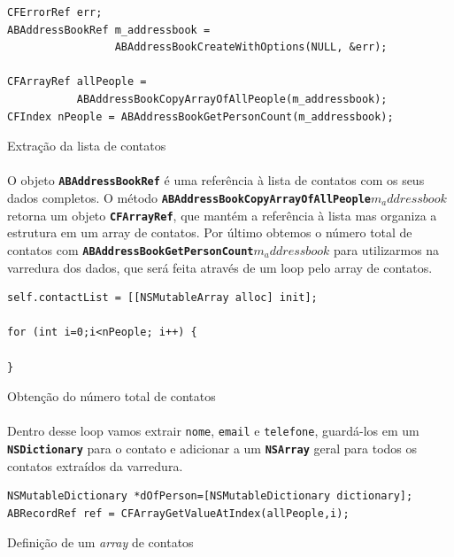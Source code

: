 \documentclass[a4paper,12pt,brazil,doubleside]{book}
\begin{document}
\begin{singlespace}
\begin{listing}[H]
\begin{verbatim}
CFErrorRef err;
ABAddressBookRef m_addressbook =
                 ABAddressBookCreateWithOptions(NULL, &err);
    
CFArrayRef allPeople =
           ABAddressBookCopyArrayOfAllPeople(m_addressbook);
CFIndex nPeople = ABAddressBookGetPersonCount(m_addressbook);
\end{verbatim}
\caption{Extração da lista de contatos}
\end{listing}

\paragraph{}O objeto \texttt{\textbf{ABAddressBookRef}} é uma referência à lista de contatos com os seus dados completos. O método \texttt{\textbf{ABAddressBookCopyArrayOfAllPeople\(m_addressbook\)}} retorna um objeto \texttt{\textbf{CFArrayRef}}, que mantém a referência à lista mas organiza a estrutura em um array de contatos. Por último obtemos o número total de contatos com
\linebreak \texttt{\textbf{ABAddressBookGetPersonCount\(m_addressbook\)}} para utilizarmos na varredura dos dados, que será feita através de um loop pelo array de contatos.

\begin{listing}[H]
\begin{verbatim}
self.contactList = [[NSMutableArray alloc] init];

for (int i=0;i<nPeople; i++) {
    
}
\end{verbatim}
\caption{Obtenção do número total de contatos}
\end{listing}

\paragraph{}Dentro desse loop vamos extrair \texttt{nome}, \texttt{email} e \texttt{telefone}, guardá-los em um \texttt{\textbf{NSDictionary}} para o contato e adicionar a um \texttt{\textbf{NSArray}} geral para todos os contatos extraídos da varredura.

\begin{listing}[H]
\begin{verbatim}
NSMutableDictionary *dOfPerson=[NSMutableDictionary dictionary];
ABRecordRef ref = CFArrayGetValueAtIndex(allPeople,i);
\end{verbatim}
\caption{Definição de um \emph{array} de contatos}
\end{listing}


\end{singlespace}
\end{document}
